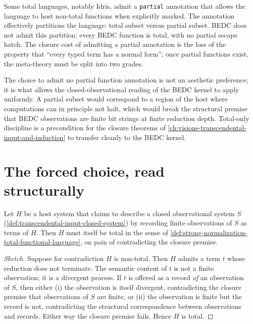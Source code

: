 \begin{remark}
\label{rem:strong-normalization-idris-partial-functions}
Some total languages, notably Idris, admit a \texttt{partial} annotation that allows the language to host non-total functions when explicitly marked. The annotation effectively partitions the language: total subset versus partial subset. BEDC does not admit this partition; every BEDC function is total, with no partial escape hatch. The closure cost of admitting a partial annotation is the loss of the property that ``every typed term has a normal form''; once partial functions exist, the meta-theory must be split into two grades.
\end{remark}

\begin{principle}
\label{prin:strong-normalization-bedc-total-only-structural}
The choice to admit no partial function annotation is not an aesthetic preference; it is what allows the closed-observational reading of the BEDC kernel to apply uniformly. A partial subset would correspond to a region of the host where computations can in principle not halt, which would break the structural premise that BEDC observations are finite bit strings at finite reduction depth. Total-only discipline is a precondition for the closure theorems of \autoref{ch:visions-transcendental-input-and-induction} to transfer cleanly to the BEDC kernel.
\end{principle}

\section{The forced choice, read structurally}
\label{sec:strong-normalization-forced-choice}

\begin{theorem}
\label{thm:strong-normalization-closed-observation-forces-totality}
Let $H$ be a host system that claims to describe a closed observational system $S$ (\autoref{def:transcendental-input-closed-system}) by recording finite observations of $S$ as terms of $H$. Then $H$ must itself be total in the sense of \autoref{def:strong-normalization-total-functional-language}, on pain of contradicting the closure premise.
\end{theorem}

\begin{proof}[Sketch]
Suppose for contradiction $H$ is non-total. Then $H$ admits a term $t$ whose reduction does not terminate. The semantic content of $t$ is not a finite observation; it is a divergent process. If $t$ is offered as a record \emph{of} an observation of $S$, then either (i) the observation is itself divergent, contradicting the closure premise that observations of $S$ are finite, or (ii) the observation is finite but the record is not, contradicting the structural correspondence between observations and records. Either way the closure premise fails. Hence $H$ is total.
\end{proof}

